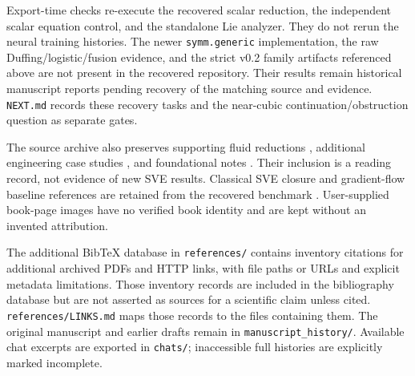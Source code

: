 \documentclass[11pt]{article}
\begin{document}
Export-time checks re-execute the recovered scalar reduction, the independent
scalar equation control, and the standalone Lie analyzer. They do not rerun
the neural training histories. The newer \texttt{symm.generic} implementation,
the raw Duffing/logistic/fusion evidence, and the strict v0.2 family artifacts
referenced above are not present in the recovered repository. Their results
remain historical manuscript reports pending recovery of the matching source
and evidence. \texttt{NEXT.md} records these recovery tasks and the near-cubic
continuation/obstruction question as separate gates.

The source archive also preserves supporting fluid reductions
\cite{shearflows,twovelocities,compressiblens,fushchych1,fushchych2,passivescalar},
additional engineering case studies \cite{bionanoflow,cassoneyring}, and
foundational notes \cite{etingof,ohrnell}. Their inclusion is a reading record,
not evidence of new SVE results. Classical SVE closure and gradient-flow
baseline references are retained from the recovered benchmark
\cite{fernandez2017,wanggradient}. User-supplied book-page images have no
verified book identity and are kept without an invented attribution.

The additional BibTeX database in \texttt{references/} contains inventory citations for
additional archived PDFs and HTTP links, with file paths or URLs and explicit
metadata limitations. Those inventory records are included in the bibliography
database but are not asserted as sources for a scientific claim unless cited.
\texttt{references/LINKS.md} maps those records to the files containing them.
The original manuscript and earlier drafts remain in
\texttt{manuscript\_history/}. Available chat excerpts are exported in
\texttt{chats/}; inaccessible full histories are explicitly marked incomplete.



\end{document}
